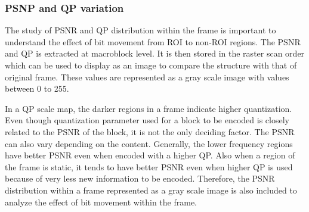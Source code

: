 \documentclass[11pt]{article} %
\begin{document}
\subsubsection{PSNP and QP variation}
The study of PSNR and QP distribution within the frame is important to understand the effect of bit movement from ROI to non-ROI regions. The PSNR and QP is extracted at macroblock level. It is then stored in the raster scan order which can be used to display as  an image to compare the structure with that of original frame. These values are represented as a gray scale image with values between 0 to 255. 

In a QP scale map, the darker regions in a frame indicate higher quantization. Even though quantization parameter used for a block to be encoded is closely related to the PSNR of the block, it is not the only deciding factor. The PSNR can also vary depending on the content. Generally, the lower frequency regions have better PSNR even when encoded with a higher QP. Also when a region of the frame is static, it tends to have better PSNR even when higher QP is used because of very less new information to be encoded. Therefore, the PSNR distribution within a frame represented as a gray scale image is also included to analyze the effect of bit movement within the frame.
\end{document}
